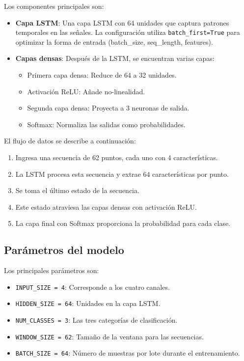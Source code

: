 Los componentes principales son:

\begin{itemize}
    \item \textbf{Capa LSTM}: Una capa LSTM con 64 unidades que captura patrones temporales en las señales. La configuración utiliza \texttt{batch\_first=True} para optimizar la forma de entrada (batch\_size, seq\_length, features).
    
    \item \textbf{Capas densas}: Después de la LSTM, se encuentran varias capas:
    \begin{itemize}
        \item Primera capa densa: Reduce de 64 a 32 unidades.
        \item Activación ReLU: Añade no-linealidad.
        \item Segunda capa densa: Proyecta a 3 neuronas de salida.
        \item Softmax: Normaliza las salidas como probabilidades.
    \end{itemize}
\end{itemize}

El flujo de datos se describe a continuación:

\begin{enumerate}
    \item Ingresa una secuencia de 62 puntos, cada uno con 4 características.
    \item La LSTM procesa esta secuencia y extrae 64 características por punto.
    \item Se toma el último estado de la secuencia.
    \item Este estado atraviesa las capas densas con activación ReLU.
    \item La capa final con Softmax proporciona la probabilidad para cada clase.
\end{enumerate}

\subsection{Parámetros del modelo}

Los principales parámetros son:

\begin{itemize}
    \item \texttt{INPUT\_SIZE = 4}: Corresponde a los cuatro canales.
    \item \texttt{HIDDEN\_SIZE = 64}: Unidades en la capa LSTM.
    \item \texttt{NUM\_CLASSES = 3}: Las tres categorías de clasificación.
    \item \texttt{WINDOW\_SIZE = 62}: Tamaño de la ventana para las secuencias.
    \item \texttt{BATCH\_SIZE = 64}: Número de muestras por lote durante el entrenamiento.
\end{itemize}

